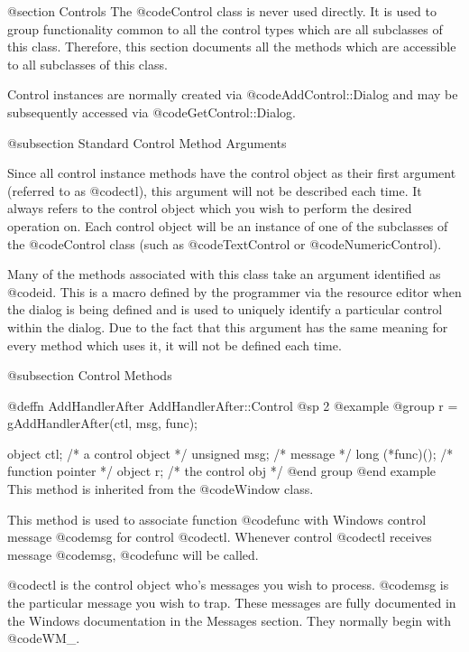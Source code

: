 @section Controls
The @code{Control} class is never used directly.  It is used to group
functionality common to all the control types which are all subclasses
of this class.  Therefore, this section documents all the methods which
are accessible to all subclasses of this class.


Control instances are normally created via @code{AddControl::Dialog}
and may be subsequently accessed via @code{GetControl::Dialog}.



@subsection  Standard Control Method Arguments

Since all control instance methods have the control object as their
first argument (referred to as @code{ctl}), this argument will not be
described each time.  It always refers to the control object which you
wish to perform the desired operation on.  Each control object will be
an instance of one of the subclasses of the @code{Control} class (such
as @code{TextControl} or @code{NumericControl}).


Many of the methods associated with this class take an argument
identified as @code{id}.  This is a macro defined by the programmer via
the resource editor when the dialog is being defined and is used to
uniquely identify a particular control within the dialog.  Due to the
fact that this argument has the same meaning for every method which
uses it, it will not be defined each time.


@subsection Control Methods












@deffn {AddHandlerAfter} AddHandlerAfter::Control
@sp 2
@example
@group
r = gAddHandlerAfter(ctl, msg, func);

object   ctl;      /*  a control object  */
unsigned msg;      /*  message           */
long    (*func)(); /*  function pointer  */
object  r;         /*  the control obj   */
@end group
@end example
This method is inherited from the @code{Window} class.

This method is used to associate function @code{func} with Windows control
message @code{msg} for control @code{ctl}.  Whenever control @code{ctl}
receives message @code{msg}, @code{func} will be called.

@code{ctl} is the control object who's messages you wish to process.
@code{msg} is the particular message you wish to trap.  These messages
are fully documented in the Windows documentation in the Messages
section.  They normally begin with @code{WM_}.

